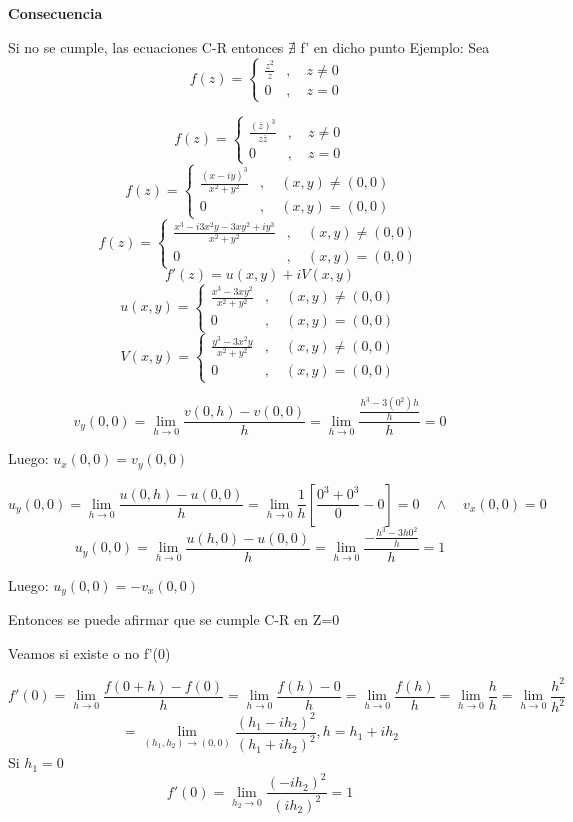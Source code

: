 \documentclass[a4paper,12pt]{article}
\begin{document}
\textbf{Consecuencia}

Si no se cumple, las ecuaciones C-R entonces $\nexists$ f' en dicho punto
Ejemplo: Sea
\[
\quad f(z) = \begin{cases}
\frac{z^2}{z} & , \quad z \neq 0 \\
0 & , \quad z = 0
\end{cases}
\]


\[
f(z) = \begin{cases}
\frac{(\bar{z})^3}{z \bar{z}} & , \quad z \neq 0 \\
0 & , \quad z = 0
\end{cases}
\]
\[
f(z) = \begin{cases}
\frac{(x - iy)^3}{x^2 + y^2} & , \quad (x, y) \neq (0, 0) \\
0 & , \quad (x, y) = (0, 0)
\end{cases}
\]
\[
f(z) = \begin{cases}
\frac{x^3 - i3x^2y - 3xy^2 + iy^3}{x^2 + y^2} & , \quad (x, y) \neq (0, 0) \\
0 & , \quad (x, y) = (0, 0)
\end{cases}
\]
\[
f'(z) = u(x, y) + iV(x, y)
\]
\[
u(x, y) = \begin{cases}
\frac{x^3 - 3xy^2}{x^2 + y^2} & , \quad (x, y) \neq (0, 0) \\
0 & , \quad (x, y) = (0, 0)
\end{cases}
\]
\[
V(x, y) = \begin{cases}
\frac{y^3 - 3x^2y}{x^2 + y^2} & , \quad (x, y) \neq (0, 0) \\
0 & , \quad (x, y) = (0, 0)
\end{cases}
\]

\[
v_y(0, 0) = \lim_{h \rightarrow 0} \frac{v(0, h) - v(0, 0)}{h} = \lim_{h \rightarrow 0} \frac{\frac{h^3 - 3(0^2)h}{h}}{h} = 0
\]


Luego: $u_x(0, 0) = v_y(0, 0)$

\[
u_y(0, 0) = \lim_{h \rightarrow 0} \frac{u(0, h) - u(0, 0)}{h} = \lim_{h \rightarrow 0} \frac{1}{h} \left[ \frac{0^3 + 0^3}{0} - 0 \right] = 0 \quad \wedge \quad v_x(0, 0) = 0
\]
\[
u_y(0, 0) = \lim_{h \rightarrow 0} \frac{u(h, 0) - u(0, 0)}{h} = \lim_{h \rightarrow 0} \frac{-\frac{h^3 - 3h0^2}{h}}{h} = 1
\]


Luego: $u_y(0, 0) = -v_x(0, 0)$

Entonces se puede afirmar que se cumple C-R en Z=0

Veamos si existe o no f'(0)

\[
f'(0) = \lim_{h \rightarrow 0} \frac{f(0 + h) - f(0)}{h} = \lim_{h \rightarrow 0} \frac{f(h) - 0}{h} = \lim_{h \rightarrow 0} \frac{f(h)}{h} = \lim_{h \rightarrow 0} \frac{h}{h} = \lim_{h \rightarrow 0} \frac{h^2}{h^2}
\]
\[
= \lim_{(h_1, h_2) \rightarrow (0, 0)} \frac{(h_1 - ih_2)^2}{(h_1 + ih_2)^2} , h = h_1 + ih_2
\]
Si $h_1 = 0$
\[
f'(0) = \lim_{h_2 \rightarrow 0} \frac{(-ih_2)^2}{(ih_2)^2} = 1
\]
\end{document}
